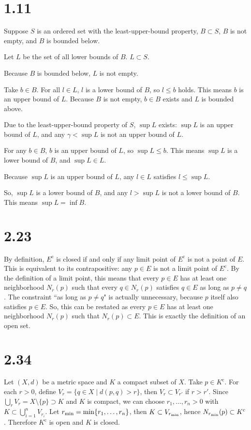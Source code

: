 \documentclass[uplatex]{jsarticle}
\begin{document}
\section{1.11}
	Suppose $S$ is an ordered set with the least-upper-bound property,
	$B \subset S$,
	$B$ is not empty,
	and $B$ is bounded below.

	Let $L$ be the set of all lower bounds of $B$. $L \subset S$.

	Because $B$ is bounded below, $L$ is not empty.

	Take $b \in B$.
	For all $l \in L$, $l$ is a lower bound of $B$,
	so $l \leq b$ holds.
	This means $b$ is an upper bound of $L$.
	Because $B$ is not empty,
	$b \in B$ exists
	and $L$ is bounded above.

	Due to the least-upper-bound property of $S$,
	$\sup L$ exists:
	$\sup L$ is an upper bound of $L$,
	and any $\gamma < \sup L$ is not an upper bound of $L$.

	For any $b \in B$,
	$b$ is an upper bound of $L$,
	so $\sup L \leq b$.
	This means $\sup L$ is a lower bound of $B$,
	and $\sup L \in L$.

	Because $\sup L$ is an upper bound of $L$,
	any $l \in L$ satisfies $l \leq \sup L$.

	So, $\sup L$ is a lower bound of $B$,
	and any $l > \sup L$ is not a lower bound of $B$.
	This means $\sup L = \inf B$.
\section{2.23}
\newcommand{\co}{\mathrm{c}}
	By definition,
	$E^\co$ is closed if and only if
	any limit point of $E^\co$ is not a point of $E$.
	This is equivalent to its contrapositive:
	any $p \in E$ is not a limit point of $E^\co$.
	By the definition of a limit point,
	this means that every $p \in E$
	has at least one neighborhood $N_r(p)$ such that
	every $q \in N_r(p)$ satisfies $q \in E$
	as long as $p \neq q$.
	The constraint ``as long as $p \neq q$" is
	actually unnecessary,
	because $p$ itself also satisfies $p \in E$.
	So, this can be restated as
	every $p \in E$ has at least one neighborhood $N_r(p)$
	such that $N_r(p) \subset E$.
	This is exactly the definition of an open set.
\section{2.34}
	Let $(X, d)$ be a metric space
	and $K$ a compact subset of $X$.
	Take $p \in K^\co$.
	For each $r > 0$,
	define $V_r = \{q \in X \mid d(p, q) > r \}$,
	then $V_r \subset V_{r'}$ if $r > r'$.
	Since $\bigcup_r V_r = X \setminus \{p\} \supset K$ and $K$ is compact,
	we can choose $r_1, \ldots, r_n > 0$
	with $K \subset \bigcup_{i = 1}^n V_{r_i}$.
	Let $r_{\rm min} = \min\{r_1, \ldots, r_n\}$,
	then $K \subset V_{r_{\rm min}}$,
	hence $N_{r_{\rm min}}(p) \subset K^\co$.
	Therefore $K^\co$ is open
	and $K$ is closed.
\end{document}
